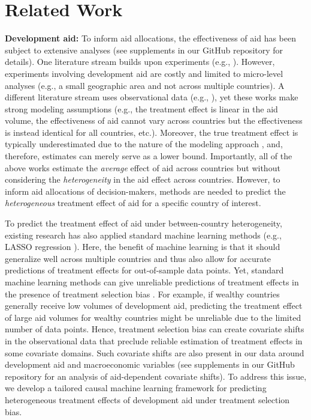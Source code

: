 \documentclass[sigconf]{acmart}
\begin{document}
\section{Related Work}

\textbf{Development aid:}
To inform aid allocations, the effectiveness of aid has been subject to extensive analyses (see supplements in our GitHub repository for details). One literature stream builds upon experiments (e.g., \cite{Duflo2003, Duflo2006}). However, experiments involving development aid are costly and limited to micro-level analyses (e.g., a small geographic area and not across multiple countries). A different literature stream uses observational data (e.g., \cite{Birchler2016, Munyanyi2020}), yet these works make strong modeling assumptions (e.g., the treatment effect is linear in the aid volume, the effectiveness of aid cannot vary across countries but the effectiveness is instead identical for all countries, etc.). Moreover, the true treatment effect is typically underestimated due to the nature of the modeling approach \cite{Birchler2016, Munyanyi2020}, and, therefore, estimates can merely serve as a lower bound. Importantly, all of the above works estimate the \emph{average} effect of aid across countries but without considering the \emph{heterogeneity} in the aid effect across countries. However, to inform aid allocations of decision-makers, methods are needed to predict the \emph{heterogeneous} treatment effect of aid for a specific country of interest.  


To predict the treatment effect of aid under between-country heterogeneity, existing research has also applied standard machine learning methods (e.g., LASSO regression \cite{Jakubik2022}). Here, the benefit of machine learning is that it should generalize well across multiple countries and thus also allow for accurate predictions of treatment effects for out-of-sample data points. Yet, standard machine learning methods can give unreliable predictions of treatment effects in the presence of treatment selection bias \cite{Shalit2017}. For example, if wealthy countries generally receive low volumes of development aid, predicting the treatment effect of large aid volumes for wealthy countries might be unreliable due to the limited number of data points. Hence, treatment selection bias can create covariate shifts in the observational data that preclude reliable estimation of treatment effects in some covariate domains. Such covariate shifts are also present in our data around development aid and macroeconomic variables (see supplements in our GitHub repository for an analysis of aid-dependent covariate shifts). To address this issue, we develop a tailored causal machine learning framework for predicting heterogeneous treatment effects of development aid under treatment selection bias.   
\end{document}
